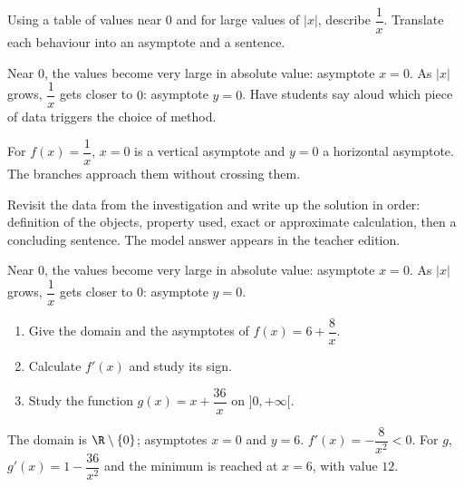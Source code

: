\begin{activity}
Using a table of values near $0$ and for large values of $|x|$, describe $\dfrac1x$. Translate each behaviour into an asymptote and a sentence.
\begin{center}\end{center}
\end{activity}
\begin{solution}Near $0$, the values become very large in absolute value: asymptote $x=0$. As $|x|$ grows, $\dfrac1x$ gets closer to $0$: asymptote $y=0$. Have students say aloud which piece of data triggers the choice of method.\end{solution}

\begin{summary}For $f(x)=\dfrac1x$, $x=0$ is a vertical asymptote and $y=0$ a horizontal asymptote. The branches approach them without crossing them.\end{summary}

\begin{example}
Revisit the data from the investigation and write up the solution in order: definition of the objects, property used, exact or approximate calculation, then a concluding sentence. The model answer appears in the teacher edition.
\end{example}
\begin{solution}Near $0$, the values become very large in absolute value: asymptote $x=0$. As $|x|$ grows, $\dfrac1x$ gets closer to $0$: asymptote $y=0$.\end{solution}

\begin{exercise}[essential]
\begin{enumerate}\item Give the domain and the asymptotes of $f(x)=6+\dfrac{8}x$.\item Calculate $f'(x)$ and study its sign.\item Study the function $g(x)=x+\dfrac{36}x$ on $]0,+\infty[$.\end{enumerate}
\end{exercise}
\begin{solution}The domain is $\R\setminus\{0\}$; asymptotes $x=0$ and $y=6$. $f'(x)=-\dfrac{8}{x^2}<0$. For $g$, $g'(x)=1-\dfrac{36}{x^2}$ and the minimum is reached at $x=6$, with value $12$.\end{solution}

